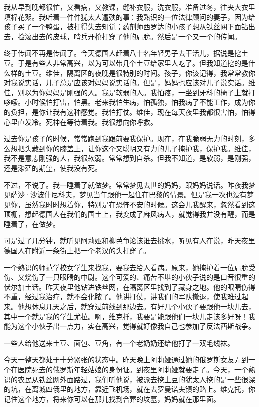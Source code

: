 我从早到晚都很忙，又看病，又教课，缝补衣服，洗衣服，准备过冬，往夹大衣里填棉花絮。我听着一件件犹太人遭殃的事：我熟识的一位法律顾问的妻子，因为给孩子买了一个鸭蛋，被打得失去知觉；药剂师西罗达的小孩子想从铁丝网下面钻出去，捡滚出去的皮球，哨兵开枪打穿了他的肩膀。然后是一个又一个的传闻。

终于传闻不再是传闻了。今天德国人赶着八十名年轻男子去干活儿，据说是挖土豆。于是有些人非常高兴，以为可以带几个土豆给家里人吃了。但我知道挖的是什么样的土豆。维佳，隔离区的夜晚是很特别的时间。孩子，你该记得，我常常教你对我说实话，儿子总是应该对妈妈说实话的。但是，妈妈也应该对儿子说实话。维佳，别以为你妈妈是刚强的人。我是软弱的人。我怕疼，一坐到牙科的椅子上就打哆嗦。小时候怕打雷，怕黑。老来我怕生病，怕孤独，怕我病了不能工作，成为你的负担，是你让我有这种感觉。我怕打仗。维佳，现在每天夜里我都很害怕，怕得心里直发冷。死神在等待着我。我很想向你呼救。

过去你是孩子的时候，常常跑到我跟前要我保护。现在，在我脆弱无力的时刻，多么想把头藏到你的膝盖上，让你这个又聪明又有力的儿子掩护我，保护我。维佳，我不是意志刚强的人，我很软弱。常常想到自杀。但我不知道，是软弱，是刚强，还是渺茫的期望，使我没有死。

不过，不说了。我一睡着了就做梦。常常梦见去世的妈妈，跟妈妈说话。昨夜我梦见萨沙·沙波什尼科夫，梦见当年跟他一起住在巴黎的情景。但是我一次也没有梦见你，虽然我时时想着你，特别是在恐怖不安的时候。这会儿我醒来，忽然看到这顶棚，想起德国人在我们的国土上，我变成了麻风病人，就觉得我并没有醒，而是睡着了，在做梦。

可是过了几分钟，就听见阿莉娅和柳芭争论该谁去挑水，听见有人在说，昨天夜里德国人在附近一条街上把一个老汉的头打穿了。

一个熟识的师范学校女学生来找我，要我去给人看病。原来，她掩护着一位肩膀受伤、又烧伤了一只眼睛的中尉。这个可爱的、痛苦不堪的小伙子说的是口音很重的伏尔加土话。昨天夜里他钻进铁丝网，在隔离区里找到了藏身之地。他的眼睛伤得不重，经过我治疗，就不会化脓了。他讲打仗，讲我们的军队撤退，使我难过起来。他想休息几天之后，就穿过前线到那边去。有好几个小伙子要跟他一块儿去，其中一个就是我的学生尤拉。啊，维克托，我要是能跟他们一块儿走该多好呀！我能为这个小伙子出一点力，实在高兴，觉得就好像我自己也参加了反法西斯战争。

一些人给他送来土豆、面包、豆角，有一个老奶奶还给他打了一双毛线袜。

今天一整天都处于十分紧张的状态中。昨天晚上阿莉娅通过她的俄罗斯女友弄到一个在医院死去的俄罗斯年轻姑娘的身份证。到夜里阿莉娅就要走了。今天，一个熟识的农民从铁丝网外面路过，我们听他说，被派去挖土豆的犹太人挖的是一些很深的坑，在离城四俄里的地方，靠近飞机场，就在去罗曼诺夫镇的路上。维克托，你记住这个地方，将来你可以在那儿找到合葬的坟墓，妈妈就在那里面。

